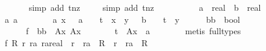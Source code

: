 \begin{isabellebody}
\ \ \ \ \ \isamarkupfalse%
\ {\isacharparenleft}simp\ add{\isacharcolon}\ t{\isacharunderscore}nz{\isacharparenright}\isanewline
\ \ \ \ \isamarkupfalse%
{\isacharparenleft}simp\ add{\isacharcolon}\ t{\isacharunderscore}nz{\isacharparenright}\isanewline
\ \ \isamarkupfalse%
\ {\isacharminus}\isanewline
\ \ \ \ \isamarkupfalse%
\ a\ {\isacharcolon}{\isacharcolon}\ real\ \ b\ {\isacharcolon}{\isacharcolon}\ real\isanewline
\ \ \ \ \isamarkupfalse%
\ a{}{\isacharcolon}\ {\isachardoublequoteopen}a\ {\isasymnoteq}\ {}{\isachardoublequoteclose}\isanewline
\ \ \ \ \isamarkupfalse%
\ a{}{\isacharcolon}\ {\isachardoublequoteopen}{\isacharparenleft}{\isasymforall}x{\isasymin}{\isasymreal}\ {\isacharminus}\ {\isacharbraceleft}{}{\isacharbraceright}{\isachardot}\ a\ {\isasymnoteq}\ {}\ {\isacharslash}\ {\isacharparenleft}t\ {\isacharasterisk}\ x{\isacharparenright}{\isacharparenright}\ {\isasymor}\ {\isacharparenleft}{\isasymforall}y{\isasymin}{\isasymreal}\ {\isacharminus}\ {\isacharbraceleft}{}{\isacharbraceright}{\isachardot}\ b\ {\isasymnoteq}\ {}\ {\isacharslash}\ {\isacharparenleft}t\ {\isacharasterisk}\ y{\isacharparenright}{\isacharparenright}{\isachardoublequoteclose}\isanewline
\ \ \ \ \isamarkupfalse%
\ bb\ {\isacharcolon}{\isacharcolon}\ bool\ \isanewline
\ \ \ \ \ \ f{}{\isacharcolon}\ {\isachardoublequoteopen}{\isacharparenleft}{\isasymnot}\ bb{\isacharparenright}\ {\isacharequal}\ {\isacharparenleft}{\isasymforall}A{\isacharunderscore}x{\isachardot}\ A{\isacharunderscore}x\ {\isasymnotin}\ {\isasymreal}\ {\isacharminus}\ {\isacharbraceleft}{}{\isacharbraceright}\ {\isasymor}\ {}\ {\isacharslash}\ {\isacharparenleft}t\ {\isacharasterisk}\ A{\isacharunderscore}x{\isacharparenright}\ {\isasymnoteq}\ a{\isacharparenright}{\isachardoublequoteclose}\isanewline
\ \ \ \ \ \ \isamarkupfalse%
\ {\isacharparenleft}metis\ {\isacharparenleft}full{\isacharunderscore}types{\isacharparenright}{\isacharparenright}\isanewline
\ \ \ \ \isamarkupfalse%
\ f{}{\isacharcolon}\ {\isachardoublequoteopen}{\isasymforall}R\ r\ ra{\isachardot}\ {\isacharparenleft}{\isacharparenleft}ra{\isacharcolon}{\isacharcolon}real{\isacharparenright}\ {\isacharequal}\ r\ {\isasymor}\ ra\ {\isasymin}\ R\ {\isacharminus}\ {\isacharbraceleft}r{\isacharbraceright}{\isacharparenright}\ {\isasymor}\ ra\ {\isasymnotin}\ R{\isachardoublequoteclose}\isanewline

\end{isabellebody}
